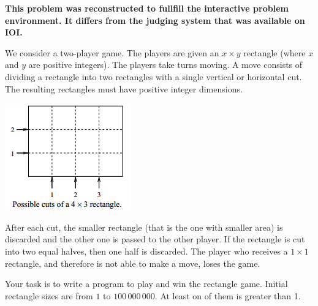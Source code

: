 {\bf This problem was reconstructed to fullfill the interactive problem environment. It differs from the judging system that was available on IOI. }

We consider a two-player game. The players are given an $x \times y$ rectangle (where $x$ and $y$ are positive integers).
The players take turns moving. A move consists of dividing a rectangle into two rectangles with a single
vertical or horizontal cut. The resulting rectangles must have positive integer dimensions.

\includegraphics{rectangle.png}

After each cut, the smaller rectangle (that is the one with smaller area) is discarded and the other one is passed
to the other player. If the rectangle is cut into two equal halves, then one half is discarded. The player who
receives a $1 \times 1$ rectangle, and therefore is not able to make a move, loses the game.

Your task is to write a program to play and win the rectangle game. 
Initial rectangle sizes are from  $1$ to $100\,000\,000$. At least on of them is greater than 1. 
